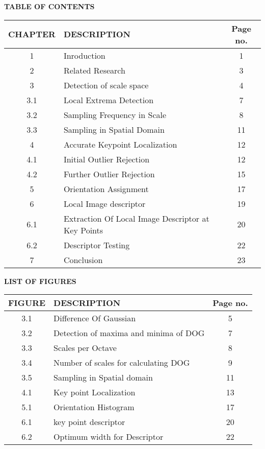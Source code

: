 \documentclass[12pt,a4paper]{report}
\newcommand{\blank}[1]{\hspace*{#1}}
\begin{document}
\begin{flushleft}
\newpage

\begin{center}\Large\textbf{TABLE OF CONTENTS}\end{center}
\vspace{10mm}

\begin{tabular}{|c |l| c|}\hline
\textbf{CHAPTER} & DESCRIPTION\blank{7cm} & \textbf{Page no.}\\ \hline
1 & Inroduction & 1\\ \hline
2 & Related Research &3\\ \hline
3 & Detection of scale space & 4\\ \hline
3.1 &  Local Extrema Detection &7\\ \hline
3.2 &  Sampling Frequency in Scale& 8\\ \hline
3.3 &  Sampling in Spatial Domain & 11\\ \hline
4 & Accurate Keypoint Localization & 12\\ \hline
4.1 & Initial Outlier Rejection &12\\ \hline
4.2 & Further Outlier Rejection & 15 \\ \hline
5 & Orientation Assignment & 17\\ \hline
6 & Local Image descriptor & 19\\ \hline
6.1 & Extraction Of Local Image Descriptor at Key Points & 20\\ \hline
6.2 & Descriptor Testing & 22\\ \hline
7 & Conclusion & 23 \\ \hline
\end{tabular}
\newpage
\listoffigures
\newpage

\begin{center}\Large\textbf{LIST OF FIGURES}\end{center}

\vspace{10mm}

\begin{tabular}{|c |l| c|}\hline
\textbf{FIGURE} &  DESCRIPTION\blank{7cm} & \textbf{Page no.}\\ \hline
3.1 &  Difference Of Gaussian & 5 \\ \hline
3.2 & Detection of maxima and minima of DOG & 7\\ \hline
3.3 &  Scales per Octave & 8\\ \hline
3.4 &  Number of scales for calculating DOG & 9\\ \hline
3.5 & Sampling in Spatial domain & 11\\ \hline
4.1 & Key point Localization  & 13\\ \hline
5.1 &  Orientation Histogram      &17\\ \hline
6.1 &   key point descriptor  &20\\ \hline
6.2 &  Optimum width for Descriptor & 22\\ \hline
\end{tabular}
\newpage
{}
\setcounter{page}{1}


\end{flushleft}
\end{document}
